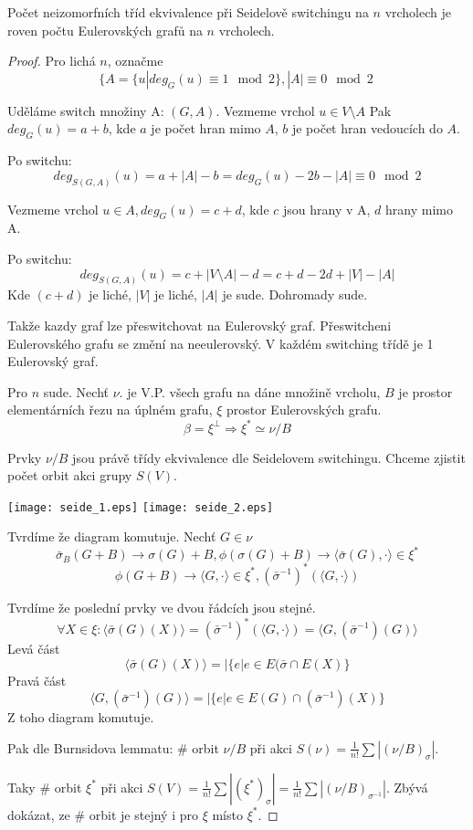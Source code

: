 \begin{theorem}
Počet neizomorfních tříd ekvivalence při Seidelově switchingu na $n$ vrcholech je roven počtu Eulerovských grafů na $n$ vrcholech.
\end{theorem}
\begin{proof}
Pro lichá $n$, označme
\[ \{ A = \{ u | deg_G(u) \equiv 1 \mod2 \}, |A| \equiv 0 \mod2\ \]

	Uděláme switch množiny A: $(G,A)$. Vezmeme vrchol $u \in V\setminus A$
	Pak $deg_G(u) = a + b$, kde $a$ je počet hran mimo $A$, $b$ je počet hran vedoucích do $A$.

	Po switchu:
	\[ deg_{S(G,A)}(u) = a + |A| - b = deg_G(u) - 2b - |A| \equiv 0 \mod2 \]

	Vezmeme vrchol $u \in A, deg_G(u) = c + d$, kde $c$ jsou hrany v A, $d$ hrany mimo A.

	Po switchu:
	\[ deg_{S(G,A)}(u) = c + |V \setminus A| - d = c + d - 2d + |V| - |A|\]
	Kde $(c + d)$ je liché, $|V|$ je liché, $|A|$ je sude. Dohromady sude.

	Takže kazdy graf lze přeswitchovat na Eulerovský graf. Přeswitcheni Eulerovského grafu se změní na neeulerovský. V každém switching třídě je 1 Eulerovský graf.

	Pro $n$ sude. Nechť $\nu$. je V.P. všech grafu na dáne množině vrcholu, $B$ je prostor elementárních řezu na úplném grafu, $\xi$ prostor Eulerovských grafu.
	\[ \beta = \xi^{\perp} \Rightarrow \xi^{\ast} \simeq \nu/B \]

	Prvky $\nu/B$ jsou právě třídy ekvivalence dle Seidelovem switchingu. Chceme zjistit počet orbit akci grupy $S(V)$.

	\texttt{[image: seide\_1.eps]}
	\texttt{[image: seide\_2.eps]}

	Tvrdíme že diagram komutuje. Nechť $G \in \nu$
	\[ \bar{\sigma}_B(G + B) \to \sigma(G) + B, \phi(\sigma(G) + B) \to \langle \bar{\sigma}(G), \cdot \rangle \in \xi^{\ast} \]
	\[ \phi(G + B) \to \langle G, \cdot \rangle \in \xi^{\ast}, (\bar{\sigma}^{-1})^{\ast}(\langle G, \cdot \rangle) \]

	Tvrdíme že poslední prvky ve dvou řádcích jsou stejné.
	\[ \forall X \in \xi: \langle \bar{\sigma}(G)(X) \rangle = (\bar{\sigma}^{-1})^{\ast}(\langle G, \cdot \rangle) = \langle G, (\bar{\sigma}^{-1})(G) \rangle \]
	Levá část
	\[ \langle \bar{\sigma}(G)(X) \rangle = |\{ e | e \in E(\bar{\sigma} \cap E(X) \} \]
	Pravá část
	\[ \langle G, (\bar{\sigma}^{-1})(G) \rangle = |\{ e | e \in E(G) \cap (\bar{\sigma}^{-1})(X) \} \]
	Z toho diagram komutuje.

	Pak dle Burnsidova lemmatu: \# orbit $\nu/B$ při akci $S(\nu) = \frac{1}{n!} \sum |(\nu/B)_{\sigma}|$.

	Taky \# orbit $\xi^{\ast}$ při akci $S(V) = \frac{1}{n!} \sum |(\xi^{\ast})_{\sigma}| = \frac{1}{n!} \sum |(\nu/B)_{\sigma^{-1}}|$.
	Zbývá dokázat, ze \# orbit je stejný i pro $\xi$ místo $\xi^{\ast}$.

\end{proof}
